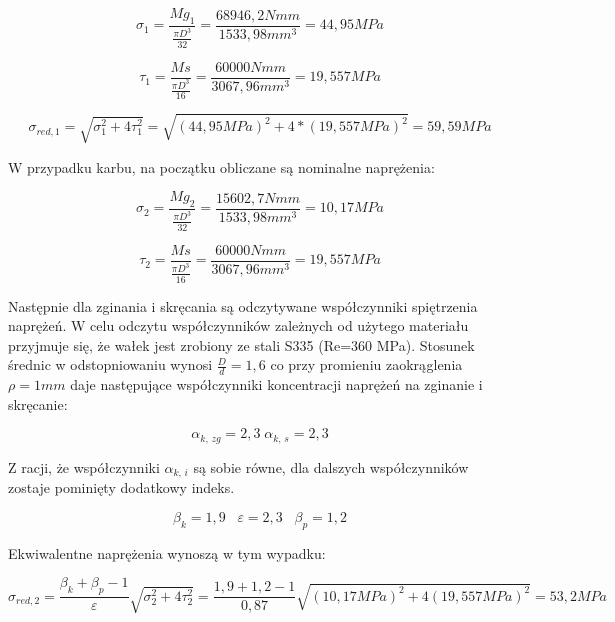         	\begin{equation}
        	\sigma_1 = \frac{Mg_1}{\frac{\pi D^3}{32}}=\frac{68946,2Nmm}{1533,98 mm^3}= 44,95 MPa
        	\end{equation}
			
			\begin{equation}
			\tau_1 = \frac{Ms}{\frac{\pi D^3}{16}}=\frac{60 000Nmm}{3067,96 mm^3}= 19,557 MPa
			\end{equation}
			
			\begin{equation}
			\sigma_{red, 1} = \sqrt{\sigma_1 ^2 + 4 \tau_1 ^2}=\sqrt{(44,95 MPa)^2+4*(19,557 MPa)^2}=59,59 MPa
			\end{equation}
			
			W przypadku karbu, na początku obliczane są nominalne naprężenia:
			
			\begin{equation}
			\sigma_2 = \frac{Mg_2}{\frac{\pi D^3}{32}}=\frac{15 602,7Nmm}{1533,98 mm^3}= 10,17 MPa
			\end{equation}
			
			\begin{equation}
			\tau_2 = \frac{Ms}{\frac{\pi D^3}{16}}=\frac{60 000Nmm}{3067,96 mm^3}= 19,557 MPa
			\end{equation}
			
			Następnie dla zginania i skręcania są odczytywane współczynniki spiętrzenia naprężeń.
			W celu odczytu współczynników zależnych od użytego materiału przyjmuje się, że wałek jest zrobiony ze stali S335 (Re=360 MPa).
			Stosunek średnic w odstopniowaniu wynosi $\frac{D}{d}=1,6$ co przy promieniu zaokrąglenia $\rho=1mm$ daje następujące współczynniki koncentracji naprężeń na zginanie i skręcanie:
			
			\begin{equation}
			\alpha_{k,\, zg}=2,3 \; \alpha_{k,\, s}= 2,3 
			\end{equation}
			 
			 Z racji, że współczynniki $\alpha_{k,\, i}$ są sobie równe, dla dalszych współczynników zostaje pominięty dodatkowy indeks.
			 
			 \begin{equation}
			 \beta_{k}=1,9 \;\;\; \varepsilon= 2,3 \;\;\; \beta_p =1,2
			 \end{equation}
			 
			 Ekwiwalentne naprężenia wynoszą w tym wypadku:
			 
			 \begin{equation}
			 \sigma_{red,2} = \frac{\beta_k+\beta_p-1}{\varepsilon} {\sqrt{\sigma_2 ^2 +4 \tau_2 ^2}}=\frac{1,9+1,2-1}{0,87} {\sqrt{(10,17 MPa) ^2 +4 (19,557MPa) ^2}}=53,2 MPa
			 \end{equation}
			

